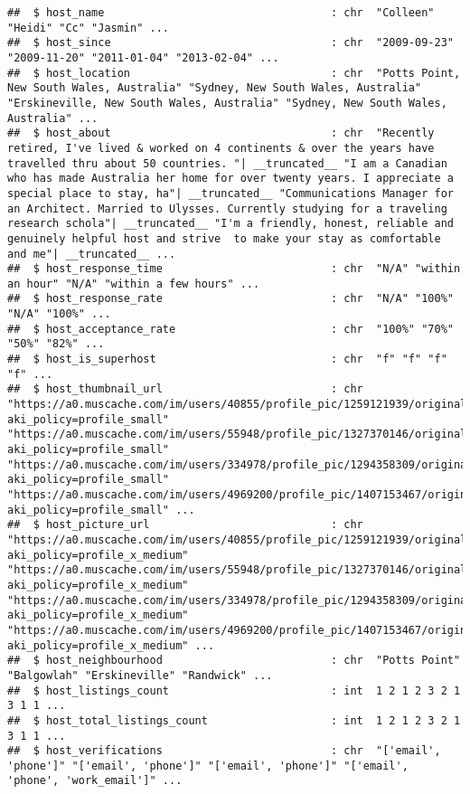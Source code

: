 \documentclass[
]{article}
\begin{document}
\begin{verbatim}
##  $ host_name                                   : chr  "Colleen" "Heidi" "Cc" "Jasmin" ...
##  $ host_since                                  : chr  "2009-09-23" "2009-11-20" "2011-01-04" "2013-02-04" ...
##  $ host_location                               : chr  "Potts Point, New South Wales, Australia" "Sydney, New South Wales, Australia" "Erskineville, New South Wales, Australia" "Sydney, New South Wales, Australia" ...
##  $ host_about                                  : chr  "Recently retired, I've lived & worked on 4 continents & over the years have travelled thru about 50 countries. "| __truncated__ "I am a Canadian who has made Australia her home for over twenty years. I appreciate a special place to stay, ha"| __truncated__ "Communications Manager for an Architect. Married to Ulysses. Currently studying for a traveling research schola"| __truncated__ "I'm a friendly, honest, reliable and genuinely helpful host and strive  to make your stay as comfortable and me"| __truncated__ ...
##  $ host_response_time                          : chr  "N/A" "within an hour" "N/A" "within a few hours" ...
##  $ host_response_rate                          : chr  "N/A" "100%" "N/A" "100%" ...
##  $ host_acceptance_rate                        : chr  "100%" "70%" "50%" "82%" ...
##  $ host_is_superhost                           : chr  "f" "f" "f" "f" ...
##  $ host_thumbnail_url                          : chr  "https://a0.muscache.com/im/users/40855/profile_pic/1259121939/original.jpg?aki_policy=profile_small" "https://a0.muscache.com/im/users/55948/profile_pic/1327370146/original.jpg?aki_policy=profile_small" "https://a0.muscache.com/im/users/334978/profile_pic/1294358309/original.jpg?aki_policy=profile_small" "https://a0.muscache.com/im/users/4969200/profile_pic/1407153467/original.jpg?aki_policy=profile_small" ...
##  $ host_picture_url                            : chr  "https://a0.muscache.com/im/users/40855/profile_pic/1259121939/original.jpg?aki_policy=profile_x_medium" "https://a0.muscache.com/im/users/55948/profile_pic/1327370146/original.jpg?aki_policy=profile_x_medium" "https://a0.muscache.com/im/users/334978/profile_pic/1294358309/original.jpg?aki_policy=profile_x_medium" "https://a0.muscache.com/im/users/4969200/profile_pic/1407153467/original.jpg?aki_policy=profile_x_medium" ...
##  $ host_neighbourhood                          : chr  "Potts Point" "Balgowlah" "Erskineville" "Randwick" ...
##  $ host_listings_count                         : int  1 2 1 2 3 2 1 3 1 1 ...
##  $ host_total_listings_count                   : int  1 2 1 2 3 2 1 3 1 1 ...
##  $ host_verifications                          : chr  "['email', 'phone']" "['email', 'phone']" "['email', 'phone']" "['email', 'phone', 'work_email']" ...

\end{verbatim}
\end{document}
